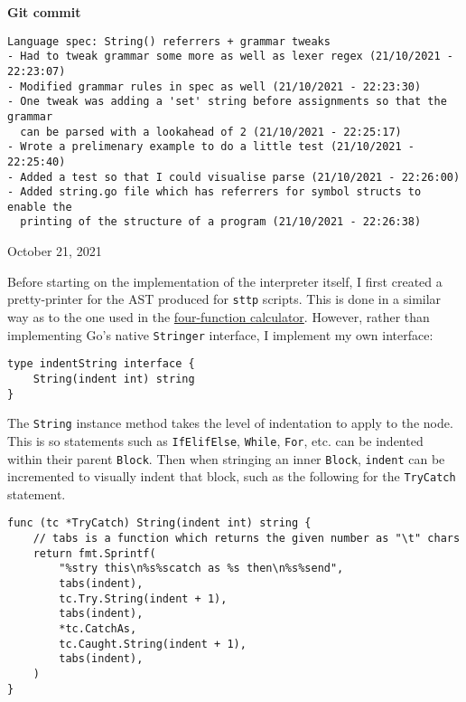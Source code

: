 \begin{center}
    \textbf{Git commit}
    \begin{verbatim}
Language spec: String() referrers + grammar tweaks
- Had to tweak grammar some more as well as lexer regex (21/10/2021 - 22:23:07)
- Modified grammar rules in spec as well (21/10/2021 - 22:23:30)
- One tweak was adding a 'set' string before assignments so that the grammar
  can be parsed with a lookahead of 2 (21/10/2021 - 22:25:17)
- Wrote a prelimenary example to do a little test (21/10/2021 - 22:25:40)
- Added a test so that I could visualise parse (21/10/2021 - 22:26:00)
- Added string.go file which has referrers for symbol structs to enable the
  printing of the structure of a program (21/10/2021 - 22:26:38)
    \end{verbatim}
    \vspace{-1em}
    \tiny{October 21, 2021}
\end{center}

Before starting on the implementation of the interpreter itself, I first created a pretty-printer for the AST produced for \verb|sttp| scripts. This is done in a similar way as to the one used in the \hyperref[sec:four-function-calc]{four-function calculator}. However, rather than implementing Go's native \verb|Stringer| interface, I implement my own interface:

\begin{verbatim}
type indentString interface {
    String(indent int) string
}
\end{verbatim}

The \verb|String| instance method takes the level of indentation to apply to the node. This is so statements such as \verb|IfElifElse|, \verb|While|, \verb|For|, etc. can be indented within their parent \verb|Block|. Then when stringing an inner \verb|Block|, \verb|indent| can be incremented to visually indent that block, such as the following for the \verb|TryCatch| statement.

\begin{verbatim}
func (tc *TryCatch) String(indent int) string {
    // tabs is a function which returns the given number as "\t" chars
    return fmt.Sprintf(
        "%stry this\n%s%scatch as %s then\n%s%send",
        tabs(indent),
        tc.Try.String(indent + 1),
        tabs(indent),
        *tc.CatchAs,
        tc.Caught.String(indent + 1),
        tabs(indent),
    )
}
\end{verbatim}

